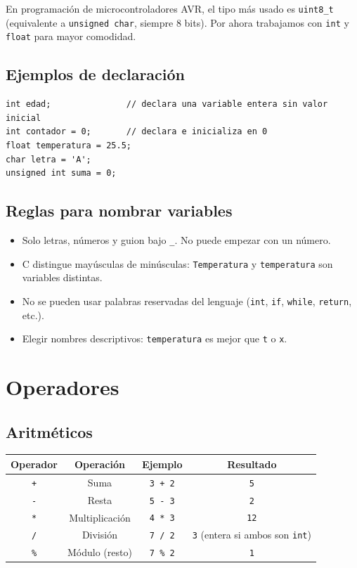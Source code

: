 \begin{notabox}
En programación de microcontroladores AVR, el tipo más usado es \texttt{uint8\_t} (equivalente a \texttt{unsigned char}, siempre 8 bits). Por ahora trabajamos con \texttt{int} y \texttt{float} para mayor comodidad.
\end{notabox}

\subsection{Ejemplos de declaración}

\begin{lstlisting}[style=estilo-c]
int edad;               // declara una variable entera sin valor inicial
int contador = 0;       // declara e inicializa en 0
float temperatura = 25.5;
char letra = 'A';
unsigned int suma = 0;
\end{lstlisting}

\subsection{Reglas para nombrar variables}

\begin{itemize}
    \item Solo letras, números y guion bajo \texttt{\_}. No puede empezar con un número.
    \item C distingue mayúsculas de minúsculas: \texttt{Temperatura} y \texttt{temperatura} son variables distintas.
    \item No se pueden usar palabras reservadas del lenguaje (\texttt{int}, \texttt{if}, \texttt{while}, \texttt{return}, etc.).
    \item Elegir nombres descriptivos: \texttt{temperatura} es mejor que \texttt{t} o \texttt{x}.
\end{itemize}

\section{Operadores}

\subsection{Aritméticos}

\begin{table}[H]
\centering
\begin{tabular}{cccc}
\toprule
Operador & Operación & Ejemplo & Resultado \\
\midrule
\texttt{+} & Suma & \texttt{3 + 2} & \texttt{5} \\
\texttt{-} & Resta & \texttt{5 - 3} & \texttt{2} \\
\texttt{*} & Multiplicación & \texttt{4 * 3} & \texttt{12} \\
\texttt{/} & División & \texttt{7 / 2} & \texttt{3} (entera si ambos son \texttt{int}) \\
\texttt{\%} & Módulo (resto) & \texttt{7 \% 2} & \texttt{1} \\
\bottomrule
\end{tabular}
\end{table}

